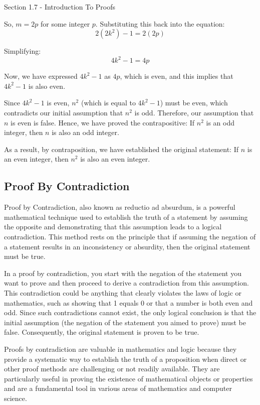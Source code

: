 \begin{notes}{Section 1.7 - Introduction To Proofs}
\begin{Highlight}
        So, $m = 2p$ for some integer $p$. Substituting this back into the equation:
        \[2(2k^2) - 1 = 2(2p)\]
        
        Simplifying:
        \[4k^2 - 1 = 4p\]
        
        Now, we have expressed $4k^2 - 1$ as $4p$, which is even, and this implies that $4k^2 - 1$ is also even.
        
        Since $4k^2 - 1$ is even, $n^2$ (which is equal to $4k^2 - 1$) must be even, which contradicts our initial assumption that $n^2$ is odd. Therefore, our assumption that $n$ is even is false. 
        Hence, we have proved the contrapositive: If $n^2$ is an odd integer, then $n$ is also an odd integer.
        

        As a result, by contraposition, we have established the original statement: If $n$ is an even integer, then $n^2$ is also an even integer.
    \end{Highlight}

    \subsection*{Proof By Contradiction}

    Proof by Contradiction, also known as reductio ad absurdum, is a powerful mathematical technique used to establish the truth of a statement by assuming the opposite and demonstrating that this 
    assumption leads to a logical contradiction. This method rests on the principle that if assuming the negation of a statement results in an inconsistency or absurdity, then the original statement 
    must be true.

    In a proof by contradiction, you start with the negation of the statement you want to prove and then proceed to derive a contradiction from this assumption. This contradiction could be anything 
    that clearly violates the laws of logic or mathematics, such as showing that 1 equals 0 or that a number is both even and odd. Since such contradictions cannot exist, the only logical conclusion 
    is that the initial assumption (the negation of the statement you aimed to prove) must be false. Consequently, the original statement is proven to be true.

    Proofs by contradiction are valuable in mathematics and logic because they provide a systematic way to establish the truth of a proposition when direct or other proof methods are challenging or 
    not readily available. They are particularly useful in proving the existence of mathematical objects or properties and are a fundamental tool in various areas of mathematics and computer science.


\end{notes}
